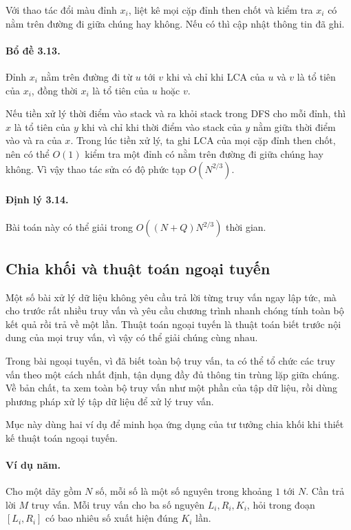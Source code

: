 \documentclass[11pt]{article}
\begin{document}
Với thao tác đổi màu đỉnh \(x_i\), liệt kê mọi cặp đỉnh then chốt và kiểm tra
\(x_i\) có nằm trên đường đi giữa chúng hay không. Nếu có thì cập nhật thông
tin đã ghi.

\paragraph{Bổ đề 3.13.}
Đỉnh \(x_i\) nằm trên đường đi từ \(u\) tới \(v\) khi và chỉ khi LCA của
\(u\) và \(v\) là tổ tiên của \(x_i\), đồng thời \(x_i\) là tổ tiên của
\(u\) hoặc \(v\).

Nếu tiền xử lý thời điểm vào stack và ra khỏi stack trong DFS cho mỗi đỉnh,
thì \(x\) là tổ tiên của \(y\) khi và chỉ khi thời điểm vào stack của \(y\)
nằm giữa thời điểm vào và ra của \(x\). Trong lúc tiền xử lý, ta ghi LCA của
mọi cặp đỉnh then chốt, nên có thể \(O(1)\) kiểm tra một đỉnh có nằm trên
đường đi giữa chúng hay không. Vì vậy thao tác sửa có độ phức tạp
\(O(N^{2/3})\).

\paragraph{Định lý 3.14.}
Bài toán này có thể giải trong \(O((N+Q)N^{2/3})\) thời gian.

\subsection{Chia khối và thuật toán ngoại tuyến}

Một số bài xử lý dữ liệu không yêu cầu trả lời từng truy vấn ngay lập tức, mà
cho trước rất nhiều truy vấn và yêu cầu chương trình nhanh chóng tính toàn bộ
kết quả rồi trả về một lần. Thuật toán ngoại tuyến là thuật toán biết trước
nội dung của mọi truy vấn, vì vậy có thể giải chúng cùng nhau.

Trong bài ngoại tuyến, vì đã biết toàn bộ truy vấn, ta có thể tổ chức các
truy vấn theo một cách nhất định, tận dụng đầy đủ thông tin trùng lặp giữa
chúng. Về bản chất, ta xem toàn bộ truy vấn như một phần của tập dữ liệu, rồi
dùng phương pháp xử lý tập dữ liệu để xử lý truy vấn.

Mục này dùng hai ví dụ để minh họa ứng dụng của tư tưởng chia khối khi thiết
kế thuật toán ngoại tuyến.

\paragraph{Ví dụ năm.}
Cho một dãy gồm \(N\) số, mỗi số là một số nguyên trong khoảng \(1\) tới
\(N\). Cần trả lời \(M\) truy vấn. Mỗi truy vấn cho ba số nguyên
\(L_i,R_i,K_i\), hỏi trong đoạn \([L_i,R_i]\) có bao nhiêu số xuất hiện đúng
\(K_i\) lần.
\end{document}
